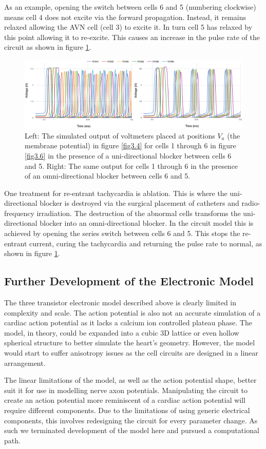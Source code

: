 As an example, opening the switch between cells 6 and 5 (numbering clockwise) means cell 4 does not excite via the forward propagation. Instead, it remains relaxed allowing the AVN cell (cell 3) to excite it. In turn cell 5 has relaxed by this point allowing it to re-excite. This causes an increase in the pulse rate of the circuit as shown in figure \ref{fig3.8}. \par
\begin{figure}[H]
    \centering
    \includegraphics[width=\textwidth]{images/Electronic6cell.png}
    \caption{Left: The simulated output of voltmeters placed at positions $V_a$ (the membrane potential) in figure \ref{fig3.4} for cells 1 through 6 in figure \ref{fig3.6} in the presence of a uni-directional blocker between cells 6 and 5. Right: The same output for cells 1 through 6 in the presence of an omni-directional blocker between cells 6 and 5.}
    \label{fig3.8}
\end{figure}

One treatment for re-entrant tachycardia is ablation. This is where the uni-directional blocker is destroyed via the surgical placement of catheters and radio-frequency irradiation. The destruction of the abnormal cells transforms the uni-directional blocker into an omni-directional blocker. In the circuit model this is achieved by opening the series switch between cells 6 and 5. This stops the re-entrant current, curing the tachycardia and returning the pulse rate to normal, as shown in figure \ref{fig3.8}. 

\subsection{Further Development of the Electronic Model}
The three transistor electronic model described above is clearly limited in complexity and scale. The action potential is also not an accurate simulation of a cardiac action potential as it lacks a calcium ion controlled plateau phase. The model, in theory, could be expanded into a cubic 3D lattice or even hollow spherical structure to better simulate the heart's geometry. However, the model would start to suffer anisotropy issues as the cell circuits are designed in a linear arrangement. \par

The linear limitations of the model, as well as the action potential shape, better suit it for use in modelling nerve axon potentials. Manipulating the circuit to create an action potential more reminiscent of a cardiac action potential will require different components. Due to the limitations of using generic electrical components, this involves redesigning the circuit for every parameter change. As such we terminated development of the model here and pursued a computational path.